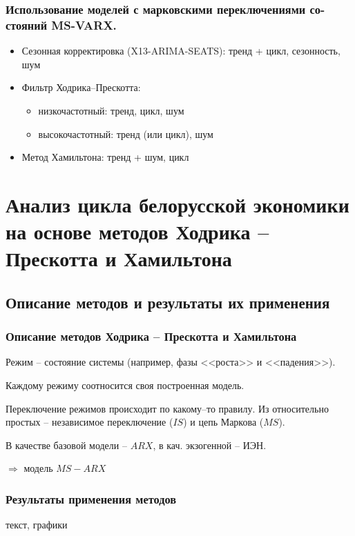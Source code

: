 \documentclass{beamer}
\begin{document}
		
		\begin{frame}
			\frametitle{Использование моделей с марковскими переключениями со-стояний MS-VARX.}
						
			
			\begin{itemize}
				\item Сезонная корректировка (X13-ARIMA-SEATS): тренд + цикл, сезонность, шум
				
				\item Фильтр Ходрика--Прескотта: 
					\begin{itemize}
						\item низкочастотный: тренд, цикл, шум
						\item высокочастотный: тренд (или цикл), шум
					\end{itemize}
				
				\item Метод Хамильтона: тренд + шум, цикл
			\end{itemize}
			
		\end{frame}
	
	
					
	\section{Анализ цикла белорусской экономики на основе методов Ходрика -- Прескотта и Хамильтона}
		\subsection{Описание методов и результаты их применения }
		\begin{frame}
			\frametitle{Описание методов Ходрика -- Прескотта и Хамильтона}
			
			
			Режим -- состояние системы (например, фазы <<роста>> и <<падения>>).
			
			Каждому режиму соотносится своя построенная модель.
			
			Переключение режимов происходит по какому--то правилу. Из относительно простых -- независимое переключение ($IS$) и цепь Маркова ($MS$).
			
			В качестве базовой модели -- $ARX$, в кач. экзогенной -- ИЭН.
			
			$ \Rightarrow $ модель $ MS-ARX $
			
		\end{frame}
	
		\begin{frame}
			\frametitle{Результаты применения методов}
			текст, графики
		\end{frame}
	
\end{document}
